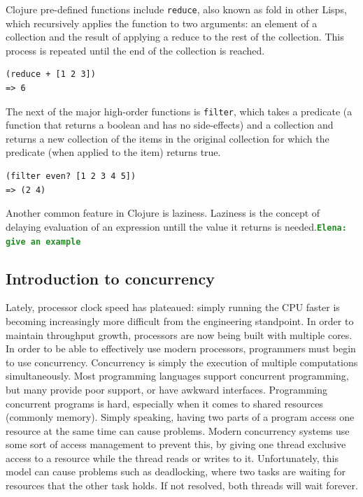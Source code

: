 \documentclass[12pt]{article}
\newcommand{\comment}[1]{{\bf \tt  {#1}}}
\newcommand{\emcomment}[1]{\textcolor{ForestGreen}{\comment{Elena: {#1}}}}
\newcommand{\clocode}[1]{{\texttt {#1}}}
\begin{document}
Clojure pre-defined functions include \clocode{reduce}, also known as fold in other Lisps, which recursively applies the function to two arguments: an element of a collection and the result of applying a reduce to the rest of the collection. This process is repeated until the end of the collection is reached. 
\begin{verbatim}
(reduce + [1 2 3])
=> 6
\end{verbatim}
The next of the major high-order functions is \clocode{filter}, which takes a predicate (a function that returns a boolean and has no side-effects) and a collection and returns a new collection of the items in the original collection for which the predicate (when applied to the item) returns true.
\begin{verbatim}
(filter even? [1 2 3 4 5])
=> (2 4)
\end{verbatim}
Another common feature in Clojure is laziness. Laziness is the concept of delaying evaluation of an expression untill the value it returns is needed.\emcomment{give an example}

\subsection{Introduction to concurrency}\label{sec:concurrency}
 Lately, processor clock speed has plateaued: simply running the CPU faster is becoming increasingly more difficult from the engineering standpoint. 
In order to maintain throughput growth, processors are now being built with multiple cores. In order to be able to effectively use modern processors, programmers must begin to use concurrency. Concurrency is simply the execution of multiple computations simultaneously. Most programming languages support concurrent programming, but many provide poor support, or have awkward interfaces. 
Programming concurrent programs is hard, especially when it comes to shared resources (commonly memory). Simply speaking, having two parts of a program access one resource at the same time can cause problems. Modern concurrency systems use some sort of access management to prevent this, by giving one thread exclusive access to a resource while the thread reads or writes to it. Unfortunately, this model can cause problems such as deadlocking, where two tasks are waiting for resources that the other task holds. If not resolved, both threads will wait forever. 
\end{document}
